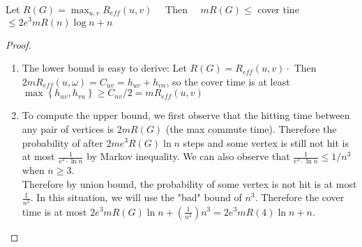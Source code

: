 \documentclass[12pt]{article}
\newenvironment{theorem}[2][Theorem]{\begin{trivlist}
\item[\hskip \labelsep {\bfseries #1}\hskip \labelsep {\bfseries #2.}]}{\end{trivlist}}
\begin{document}
\begin{theorem}{3}
	Let $R ( G ) = \max _ { u , v } R _ { e f f } ( u , v ) \quad$ Then $\quad m R ( G ) \leqslant$ cover tine $\leqslant 2 e ^ { 3 } m R ( n ) \log n + n$
\end{theorem}
\begin{proof}
	\begin{enumerate}
		\item The lower bound is easy to derive: Let $R ( G ) = R _ { e f f } ( u , v ) \cdot$ Then $2 m R _ { e f f } ( u , \omega ) = C _ { u v } = h _ { u v } + h _ { v n }$, so the cover time is at least $\max \left\{ h _ { u v } , h _ { v u } \right\} \geq C _ { n v } / 2 = m R _ { e f f } ( u , v )$
		\item To compute the upper bound, we first observe that the hitting time between any pair of vertices is $2mR(G)$ (the max commute time). Therefore the probability of  after $2me^3R(G)\ln{n}$ steps and some vertex is still not hit is at most $\frac{1}{e^3 \cdot \ln{n}}$ by Markov inequality. We can also observe that $\frac{1}{e^3 \cdot \ln{n}} \leq 1/n^3$ when $n \geq 3$.\\
		\newline
		Therefore by union bound, the probability of some vertex is not hit is at most $\frac{1}{n^2}$. In this situation, we will use the "bad" bound of $n^3$. Therefore the cover time is at most $2 e ^ { 3 } m R ( G ) \ln n + \left( \frac { 1 } { n ^ { 2 } } \right) n ^ { 3 } = 2 e ^ { 3 } m R ( 4 ) \ln n + n$.
	\end{enumerate}
\end{proof}
\end{document}
